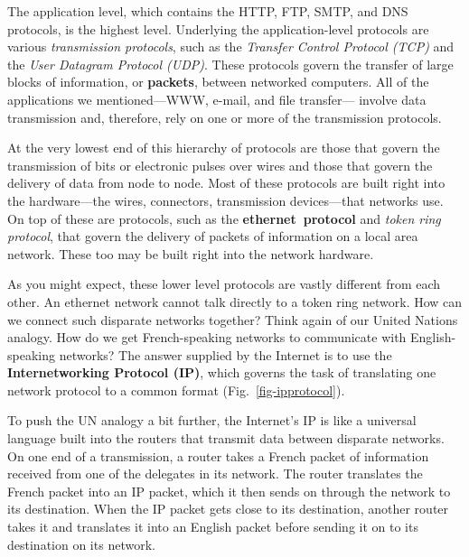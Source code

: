 The application level, which contains the HTTP, FTP, SMTP, and DNS
protocols, is the highest level.  Underlying the application-level
protocols are various {\it transmission protocols}, such as the {\it
Transfer Control Protocol (TCP)} and the {\it User Datagram Protocol
(UDP)}.  These protocols govern the transfer of large blocks of
information, or {\bf packets}, between networked computers.  All of
the applications we mentioned---WWW, e-mail, and file transfer---
involve
data transmission and, therefore, rely on one or more of the
transmission protocols.

At the very lowest end of this hierarchy of protocols are those that
govern the transmission of bits or electronic pulses over wires and
those that govern the delivery of data from node to node.  Most of
these protocols are built right into the hardware---the wires,
connectors, transmission devices---that networks use.   On top of
these are protocols, such as the \mbox{\bf ethernet protocol} and {\it
token ring protocol}, that govern the delivery of packets of
information on a local area network.  These too may be built right into
the network hardware.

As you might expect, these lower level protocols are vastly different
from each other.  An ethernet network cannot talk directly to a
token ring network.  How can we connect such disparate networks
together?  Think again of our United Nations analogy.  How do we get
French-speaking networks to communicate with English-speaking networks?
The answer supplied by the Internet is to use the {\bf Internetworking
Protocol (IP)}, which governs the task of translating one network
protocol to a common format (Fig.~\ref{fig-ipprotocol}).


To push the UN analogy a bit further, the Internet's IP is like a
universal language built into the routers that transmit data between
disparate networks.   On one end of a transmission, a router takes a
French packet of information received from one of the delegates in its
network.  The router translates the French packet into an IP packet, which
it then sends on through the network to its destination.   When the IP
packet gets close to its destination, another router takes it and
translates it into an English packet before sending it on to its
destination on its network.

